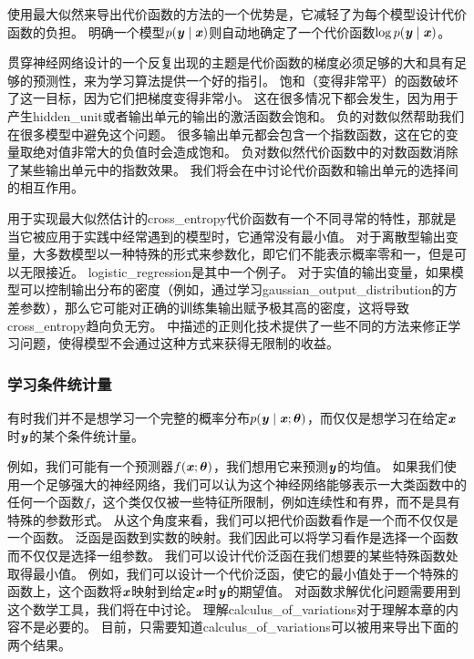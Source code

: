 使用最大似然来导出代价函数的方法的一个优势是，它减轻了为每个模型设计代价函数的负担。
明确一个模型$p(\boldsymbol{\mathit{y}}\mid\boldsymbol{\mathit{x}})$则自动地确定了一个代价函数$\log p(\boldsymbol{\mathit{y}}\mid\boldsymbol{\mathit{x}})$。

贯穿神经网络设计的一个反复出现的主题是代价函数的梯度必须足够的大和具有足够的预测性，来为学习算法提供一个好的指引。
饱和（变得非常平）的函数破坏了这一目标，因为它们把梯度变得非常小。
这在很多情况下都会发生，因为用于产生\gls{hidden_unit}或者输出单元的输出的激活函数会饱和。
负的对数似然帮助我们在很多模型中避免这个问题。
很多输出单元都会包含一个指数函数，这在它的变量取绝对值非常大的负值时会造成饱和。
负对数似然代价函数中的对数函数消除了某些输出单元中的指数效果。
我们将会在中讨论代价函数和输出单元的选择间的相互作用。


用于实现最大似然估计的\gls{cross_entropy}代价函数有一个不同寻常的特性，那就是当它被应用于实践中经常遇到的模型时，它通常没有最小值。
对于离散型输出变量，大多数模型以一种特殊的形式来参数化，即它们不能表示概率零和一，但是可以无限接近。
\gls{logistic_regression}是其中一个例子。
对于实值的输出变量，如果模型可以控制输出分布的密度（例如，通过学习\gls{gaussian_output_distribution}的方差参数），那么它可能对正确的训练集输出赋予极其高的密度，这将导致\gls{cross_entropy}趋向负无穷。
中描述的正则化技术提供了一些不同的方法来修正学习问题，使得模型不会通过这种方式来获得无限制的收益。

\subsubsection{学习条件统计量}
\label{sec:learning_conditional_statistics}

有时我们并不是想学习一个完整的概率分布$p(\boldsymbol{\mathit{y}}\mid\boldsymbol{\mathit{x}}; \boldsymbol{\theta})$，而仅仅是想学习在给定$\boldsymbol{\mathit{x}}$时$\boldsymbol{\mathit{y}}$的某个条件统计量。

例如，我们可能有一个预测器$f(\boldsymbol{\mathit{x}}; \boldsymbol{\theta})$，我们想用它来预测$\boldsymbol{\mathit{y}}$的均值。
如果我们使用一个足够强大的神经网络，我们可以认为这个神经网络能够表示一大类函数中的任何一个函数$f$，这个类仅仅被一些特征所限制，例如连续性和有界，而不是具有特殊的参数形式。
从这个角度来看，我们可以把代价函数看作是一个而不仅仅是一个函数。
泛函是函数到实数的映射。我们因此可以将学习看作是选择一个函数而不仅仅是选择一组参数。
我们可以设计代价泛函在我们想要的某些特殊函数处取得最小值。
例如，我们可以设计一个代价泛函，使它的最小值处于一个特殊的函数上，这个函数将$\boldsymbol{\mathit{x}}$映射到给定$\boldsymbol{\mathit{x}}$时$\boldsymbol{\mathit{y}}$的期望值。
对函数求解优化问题需要用到这个数学工具，我们将在中讨论。
理解\gls{calculus_of_variations}对于理解本章的内容不是必要的。
目前，只需要知道\gls{calculus_of_variations}可以被用来导出下面的两个结果。

